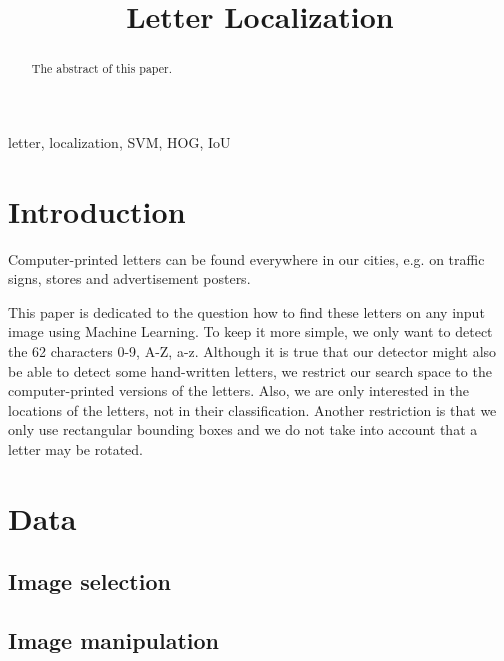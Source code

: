 \documentclass[conference]{IEEEtran}
\begin{document}
\title{Letter Localization}

\author{
}

\maketitle

\begin{abstract}
The abstract of this paper.
\end{abstract}

\begin{IEEEkeywords}
letter, localization, SVM, HOG, IoU
\end{IEEEkeywords}

\section{Introduction}

Computer-printed letters can be found everywhere in our cities, e.g. on traffic signs, stores and advertisement posters. 

This paper is dedicated to the question how to find these letters on any input image using Machine Learning. To keep it more simple, we only want to detect the 62 characters 0-9, A-Z, a-z. Although it is true that our detector might also be able to detect some hand-written letters, we restrict our search space to the computer-printed versions of the letters. Also, we are only interested in the locations of the letters, not in their classification. Another restriction is that we only use rectangular bounding boxes and we do not take into account that a letter may be rotated.

\section{Data}

\subsection{Image selection}

\subsection{Image manipulation}
\end{document}
